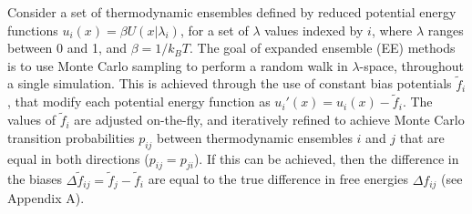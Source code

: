 \documentclass[%
 aip,
rsi,%
 amsmath,amssymb,
 reprint,%
]{revtex4-1}
\begin{document}
Consider a set of thermodynamic ensembles defined by reduced potential energy functions $u_i(x) = \beta U(x|\lambda_i)$, for a set of $\lambda$ values indexed by $i$, where $\lambda$ ranges between 0 and 1, and $\beta = 1/k_BT$.  The goal of expanded ensemble (EE) methods is to use Monte Carlo sampling to perform a random walk in $\lambda$-space, throughout a single simulation.  This is achieved through the use of constant bias potentials $\tilde{f}_i$, that modify each potential energy function as $u_i'(x) = u_i(x) - \tilde{f}_i$. The values of $\tilde{f}_i$ are adjusted on-the-fly, and iteratively refined to achieve Monte Carlo transition probabilities $p_{ij}$ between thermodynamic ensembles $i$ and $j$ that are equal in both directions ($p_{ij} = p_{ji}$).  If this can be achieved, then the difference in the biases $\Delta \tilde{f}_{ij} = \tilde{f}_j - \tilde{f}_i$ are equal to the true difference in free energies $\Delta f_{ij}$ (see Appendix A).



\end{document}

